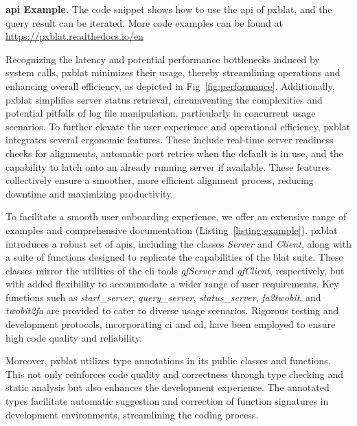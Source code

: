 \documentclass[10pt,letterpaper]{article}
\begin{document}
\begin{listing}
	\inputminted[breaklines]{python}{code/example1.py}
	\caption{{\bf \gls{api} Example.} The code snippet shows how to use the \gls{api} of \gls{pxblat},
		and the query result can be iterated. More code examples can be found at \url{https://pxblat.readthedocs.io/en}}
	\label{listing:example}
\end{listing}

Recognizing the latency and potential performance bottlenecks induced by system calls, \gls{pxblat} minimizes their usage, thereby streamlining operations and enhancing overall efficiency, as depicted in Fig~\ref{fig:performance}.
Additionally, \gls{pxblat} simplifies server status retrieval, circumventing the complexities and potential pitfalls of log file manipulation, particularly in concurrent usage scenarios.
To further elevate the user experience and operational efficiency, \gls{pxblat} integrates several ergonomic features.
These include real-time server readiness checks for alignments, automatic port retries when the default is in use, and the capability to latch onto an already running server if available.
These features collectively ensure a smoother, more efficient alignment process, reducing downtime and maximizing productivity.

To facilitate a smooth user onboarding experience, we offer an extensive range of examples and comprehensive documentation (Listing~\ref{listing:example}).
\gls{pxblat} introduces a robust set of \glspl{api}, including the classes \emph{Server} and \emph{Client}, along with a suite of functions designed to replicate the capabilities of the \gls{blat} suite.
These classes mirror the utilities of the \gls{cli} tools \emph{gfServer} and \emph{gfClient}, respectively, but with added flexibility to accommodate a wider range of user requirements.
Key functions such as \emph{start\_server}, \emph{query\_server}, \emph{status\_server}, \emph{fa2twobit}, and \emph{twobit2fa} are provided to cater to diverse usage scenarios.
Rigorous testing and development protocols, incorporating \gls{ci} and \gls{cd}, have been employed to ensure high code quality and reliability.

Moreover, \gls{pxblat} utilizes type annotations in its public classes and functions.
This not only reinforces code quality and correctness through type checking and static analysis but also enhances the development experience.
The annotated types facilitate automatic suggestion and correction of function signatures in development environments, streamlining the coding process.
\end{document}
